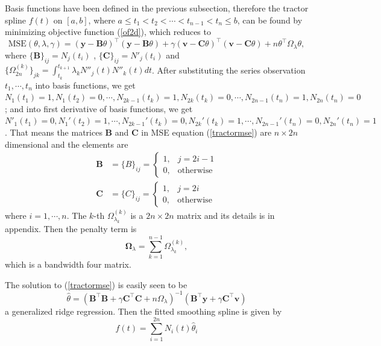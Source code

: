 Basis functions have been defined in the previous subsection, therefore the tractor spline $f(t)$ on $[a,b]$, where $a \leq t_1 < t_2< \cdots < t_{n-1}<t_n \leq b$, can be found by minimizing  objective function (\ref{of2d}), which reduces to
\begin{equation}\label{tractormse}
\text{MSE}(\theta, \lambda,\gamma) = (\mathbf{y}-\mathbf{B}\theta)^\top (\mathbf{y}-\mathbf{B}\theta) +\gamma (\mathbf{v}-\mathbf{C}\theta)^\top (\mathbf{v}-\mathbf{C}\theta)+n \theta^\top\Omega_{\lambda}\theta,
\end{equation}
where $\{\mathbf{B}\}_{ij} = N_j(t_i)$ , $\{\mathbf{C}\}_{ij} = N'_j(t_i)$ and $\{\Omega_{2n}^{(k)} \}_{jk}=\int_{t_k}^{t_{k+1}}\lambda_k N''_j(t)N''_k(t)dt$. After substituting the series observation $t_1, \cdots, t_n$ into basis functions, we get $N_1(t_1)=1, N_1(t_2)=0, \cdots, N_{2k-1}(t_{k})=1, N_{2k}(t_{k})=0, \cdots, N_{2n-1}(t_n)=1, N_{2n}(t_n)=0$; and into first derivative of basis functions, we get $N'_1(t_1)=0, N_1'(t_2)=1, \cdots, N_{2k-1}'(t_{k})=0, N_{2k}'(t_{k})=1, \cdots, N_{2n-1}'(t_n)=0, N_{2n}'(t_n)=1$. That means the matrices $\mathbf{B}$ and $\mathbf{C}$ in MSE equation (\ref{tractormse}) are $n \times 2n$ dimensional and the elements are
\begin{align}
\mathbf{B}&=\{B\}_{ij}=\begin{cases}
1, & j=2i-1\\
0, & \mbox{otherwise}
\end{cases}\\
\mathbf{C}&=\{C\}_{ij}=\begin{cases}
1, & j=2i\\
0, & \mbox{otherwise}
\end{cases}
\end{align}
where $i=1, \cdots, n$.  The $k$-th $\Omega_{\lambda_k}^{(k)}$ is a $2n \times 2n$ matrix and its details is in appendix. Then the penalty term is
\begin{equation}
\mathbf{\Omega}_\lambda=\sum_{k=1}^{n-1}\Omega_{\lambda_k}^{(k)},
\end{equation}
which is a bandwidth four matrix.


The solution to (\ref{tractormse}) is easily seen to be
\begin{equation}\label{thetahat}
\hat{\theta}=(\mathbf{B}^\top\mathbf{B}+\gamma\mathbf{C}^\top\mathbf{C}+n\Omega_{\lambda})^{-1}(\mathbf{B}^\top\mathbf{y}+\gamma\mathbf{C}^\top\mathbf{v})
\end{equation}
a generalized ridge regression. Then the fitted smoothing spline is given by
\begin{equation}
\hat{f}(t)=\sum_{i=1}^{2n}N_i(t)\hat{\theta}_i
\end{equation}

